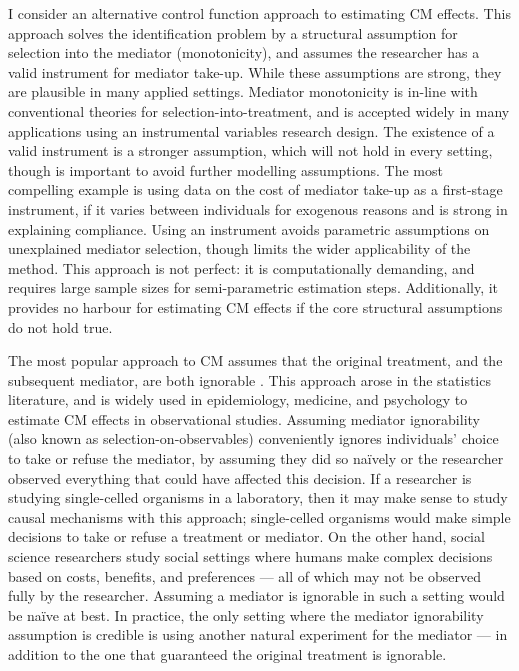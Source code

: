 I consider an alternative control function approach to estimating CM effects.
This approach solves the identification problem by a structural assumption for selection into the mediator (monotonicity), and assumes the researcher has a valid instrument for mediator take-up.
While these assumptions are strong, they are plausible in many applied settings.
Mediator monotonicity is in-line with conventional theories for selection-into-treatment, and is accepted widely in many applications using an instrumental variables research design.
The existence of a valid instrument is a stronger assumption, which will not hold in every setting, though is important to avoid further modelling assumptions. %
The most compelling example is using data on the cost of mediator take-up as a first-stage instrument, if it varies between individuals for exogenous reasons and is strong in explaining compliance.
Using an instrument avoids parametric assumptions on unexplained mediator selection, though limits the wider applicability of the method.
This approach is not perfect: it is computationally demanding, and requires large sample sizes for semi-parametric estimation steps.
Additionally, it provides no harbour for estimating CM effects if the core structural assumptions do not hold true.

The most popular approach to CM assumes that the original treatment, and the subsequent mediator, are both ignorable \citep{imai2010identification}.
This approach arose in the statistics literature, and is widely used in epidemiology, medicine, and psychology to estimate CM effects in observational studies.
Assuming mediator ignorability (also known as selection-on-observables) conveniently ignores individuals' choice to take or refuse the mediator, by assuming they did so na\"ively or the researcher observed everything that could have affected this decision.
If a researcher is studying single-celled organisms in a laboratory, then it may make sense to study causal mechanisms with this approach; single-celled organisms would make simple decisions to take or refuse a treatment or mediator.
On the other hand, social science researchers study social settings where humans make complex decisions based on costs, benefits, and preferences --- all of which may not be observed fully by the researcher.
Assuming a mediator is ignorable in such a setting would be na\"ive at best.
In practice, the only setting where the mediator ignorability assumption is credible is using another natural experiment for the mediator --- in addition to the one that guaranteed the original treatment is ignorable.


